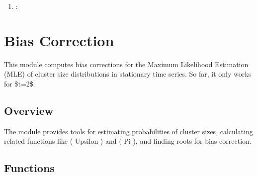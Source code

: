 \documentclass[a4paper,11pt,openany,english]{sphinxmanual}
\begin{document}
\begin{enumerate}
\item {} 
\sphinxAtStartPar
{}:
\begin{quote}

\begin{sphinxVerbatim}[commandchars=\\\{\}]
   

  
  
  \PYG{p}{[}\PYG{p}{]}
    
 
\end{sphinxVerbatim}
\end{quote}

\end{enumerate}

\sphinxstepscope


\chapter{Bias Correction}
\label{\detokenize{api_biascorrection:bias-correction}}\label{\detokenize{api_biascorrection::doc}}
\sphinxAtStartPar
This module computes bias corrections for the Maximum Likelihood Estimation (MLE) of cluster size distributions in stationary time series. So far, it only works for \$t=2\$.


\section{Overview}
\label{\detokenize{api_biascorrection:overview}}
\sphinxAtStartPar
The  module provides tools for estimating probabilities of cluster sizes, calculating related functions like ( Upsilon ) and ( Pi ), and finding roots for bias correction.


\section{Functions}
\label{\detokenize{api_biascorrection:functions}}
\end{document}
